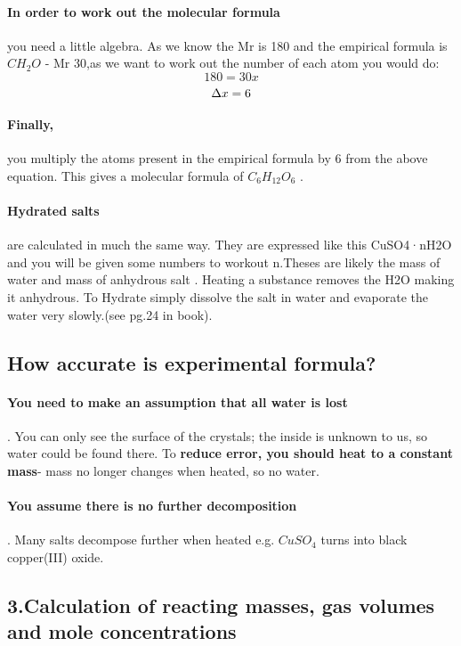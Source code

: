 \paragraph{In order to work out the molecular formula} you need a little algebra. As we know the Mr is 180 and the empirical formula is \(CH_2O\) - Mr 30,as we want to work out the number of each atom you would do:
\newline \[180=30x\] \[\Delta\\x=6\]
\paragraph{Finally,} you multiply the atoms present in the empirical formula by 6 from the above equation. This gives a molecular formula of \(C_6H_{12}O_6\) .
\paragraph{Hydrated salts} are calculated in much the same way. They are expressed
like this CuSO4·nH2O and you will be given some numbers to workout n.Theses are likely the mass of water and mass of anhydrous salt .
\newline Heating a substance removes the H2O making it anhydrous. To Hydrate simply dissolve the salt in water and evaporate the water very slowly.(see pg.24 in book).
\subsection{How accurate is experimental formula?}
\paragraph{You need to make an assumption that all water is lost}. You can only see the surface of the crystals; the inside is unknown to us, so water could be found there. To \textbf{reduce error, you should heat to a constant mass}- mass no longer changes when heated, so no water.
\paragraph{You assume there is no further decomposition}. Many salts decompose further when heated e.g. \(CuSO_4\) turns into black copper(III) oxide.
\subsection{3.Calculation of reacting masses, gas volumes and mole concentrations}
